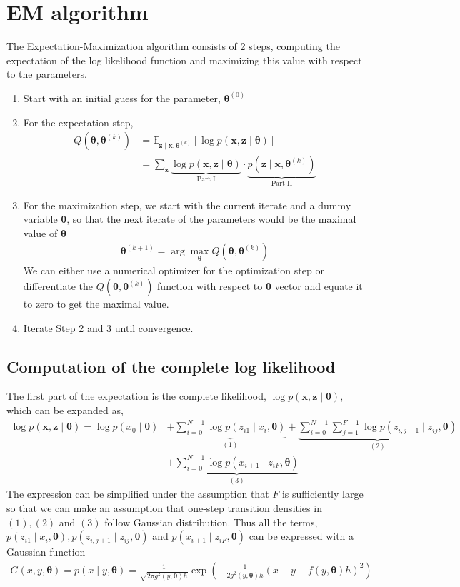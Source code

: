 \documentclass[12pt]{article}
\newcommand{\bx}{\ensuremath{\mathbf{x}}}
\newcommand{\bz}{\ensuremath{\mathbf{z}}}
\newcommand{\btheta}{\ensuremath{\boldsymbol{\theta}}}
\begin{document}
\section{EM algorithm}
The Expectation-Maximization algorithm consists of 2 steps, computing the expectation of the log likelihood function and maximizing this value with respect to the parameters.
\begin{enumerate}
\item Start with an initial guess for the parameter, $\btheta^{(0)}$
\item For the expectation step,
\begin{align}
\label{eqn:expectation}
Q(\btheta, \btheta^{(k)}) & = \mathbb{E}_{\bz \mid \bx, \btheta^{(k)}} [\log p(\bx, \bz \mid \btheta)] \\
& = \sum_{\bz} \underbrace{\log p(\bx, \bz \mid \btheta)}_{\text{Part I}} \cdot \underbrace{p(\bz \mid \bx, \btheta^{(k)})}_{\text{Part II}}
\end{align}
\item For the maximization step, we start with the current iterate and a dummy variable $\btheta$, so that the next iterate of the parameters would be the maximal value of $\btheta$
\begin{align}
\label{eqn:maximization}
\btheta^{(k+1)} = \arg \max_{\btheta} Q(\btheta, \btheta^{(k)}) 
\end{align}
We can either use a numerical optimizer for the optimization step or differentiate the $Q(\btheta, \btheta^{(k)})$ function with respect to $\btheta$ vector and equate it to zero to get the maximal value.
\item Iterate Step 2 and 3 until convergence.
\end{enumerate}

\subsection{Computation of the complete log likelihood}
\label{sect:loglik}
The first part of the expectation is the complete likelihood, $\log p(\bx, \bz \mid \btheta)$, which can be expanded as,
\begin{align}
\label{eqn:loglik}
\log p(\bx, \bz \mid \btheta) = \log p(x_0 \mid \btheta) & + \underbrace{\sum_{i=0}^{N-1} \log p(z_{i1} \mid x_i, \btheta)}_{(1)} + \underbrace{\sum_{i=0}^{N-1} \sum_{j=1}^{F-1} \log p(z_{i,j+1} \mid z_{ij}, \btheta)}_{(2)} \nonumber \\ 
& + \underbrace{\sum_{i=0}^{N-1} \log p(x_{i+1} \mid z_{iF}, \btheta)}_{(3)} 
\end{align}
The expression can be simplified under the assumption that $F$ is sufficiently large so that we can make an assumption that one-step transition densities in $(1), (2)$ and $(3)$ follow Gaussian distribution. Thus all the terms, $p(z_{i1} \mid x_i, \btheta), p(z_{i,j+1} \mid z_{ij}, \btheta)$ and $p(x_{i+1} \mid z_{iF}, \btheta)$ can be expressed with a Gaussian function
\begin{align*}
G(x,y, \btheta) = p(x \mid y, \btheta) = \frac{1}{\sqrt{2 \pi g^2(y, \btheta)h}} \exp \left( - \frac{1}{2 g^2(y, \btheta)h} (x - y - f(y, \btheta)h)^2 \right)
\end{align*}
\end{document}
